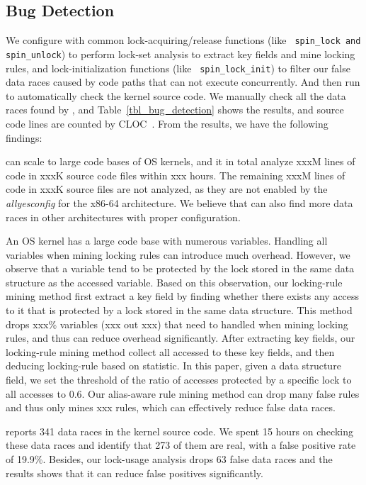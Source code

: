 \subsection{Bug Detection}
\label{subsec_bug_detection}

We configure \sys with common lock-acquiring/release functions (like {\tt 
spin\_lock and spin\_unlock}) to perform lock-set analysis to extract key 
fields and mine locking rules, and lock-initialization functions (like {\tt 
spin\_lock\_init}) to filter our false data races caused by code paths that 
can not execute concurrently. And then run \sys to automatically check the 
kernel source code. We manually check all the data races found by \sys, and 
Table~\ref{tbl_bug_detection} shows the results, and source code lines are 
counted by CLOC~\cite{cloc}. From the results, we have the following findings:

 \sys can scale to large code bases of OS kernels, and it in 
total analyze xxxM lines of code in xxxK source code files within xxx hours. 
The remaining xxxM lines of code in xxxK source files are not analyzed, as they 
are not enabled by the {\em allyesconfig} for the x86-64 architecture. We 
believe that \sys can also find more data races in other architectures with 
proper configuration.

 An OS kernel has a large code base with numerous 
variables. Handling all variables when mining locking rules can introduce much 
overhead. However, we observe that a variable tend to be protected by the lock 
stored in the same data structure as the accessed variable. Based on this 
observation, our locking-rule mining method first extract a key field by 
finding whether there exists any access to it that is protected by a lock 
stored in the same data structure. This method drops xxx\% variables (xxx out 
xxx) that need to handled when mining locking rules, and thus can reduce 
overhead significantly. After extracting key fields, our locking-rule mining 
method collect all accessed to these key fields, and then deducing locking-rule 
based on statistic. In this paper, given a data structure field, we set the 
threshold of the ratio of accesses protected by a specific lock to all accesses 
to 0.6. Our alias-aware rule mining method can drop many false rules and thus 
only mines xxx rules, which can effectively reduce false data races.

 \sys reports 341 data races in the kernel source 
code. We spent 15 hours on checking these data races and identify that 273 of 
them are real, with a false positive rate of 19.9\%. Besides, our lock-usage 
analysis drops 63 false data races and the results shows that it can reduce 
false positives significantly.

